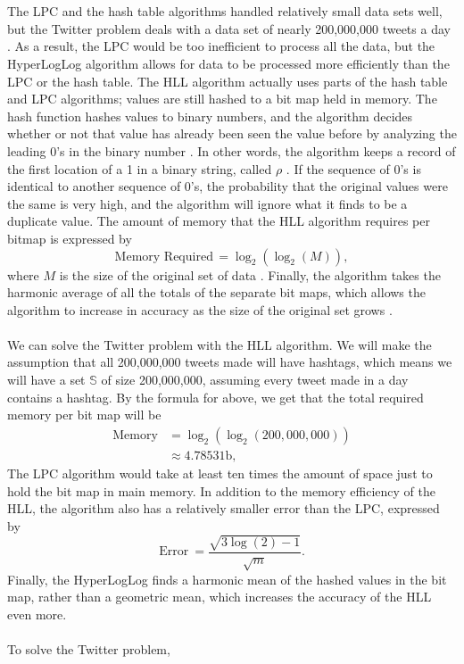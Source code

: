 \documentclass{article}
\begin{document}
\\\\
\indent The LPC and the hash table algorithms handled relatively small data sets well, but the Twitter problem deals with a data set of nearly 200,000,000 tweets a day \cite{Twitter-2}.
As a result, the LPC would be too inefficient to process all the data, but the HyperLogLog algorithm allows for data to be processed more efficiently than the LPC or the hash table. 
The HLL algorithm actually uses parts of the hash table and LPC algorithms; values are still hashed to a bit map held in memory. 
The hash function hashes values to binary numbers, and the algorithm decides whether or not that value has already been seen the value before by analyzing the leading 0's in the binary number \cite[pp. 685, 689]{Heule}.
In other words, the algorithm keeps a record of the first location of a 1 in a binary string, called $\rho$ \cite[pp. 130]{Flaj}.
If the sequence of 0's is identical to another sequence of 0's, the probability that the original values were the same is very high, and the algorithm will ignore what it finds to be a duplicate value. 
The amount of memory that the HLL algorithm requires per bitmap is expressed by
\[
\text{Memory Required}\, = \log_{2}{\left(\log_{2}{\left(M \right)}\right)},
\]
where $M$ is the size of the original set of data \cite[pp. 129]{Flaj}.
Finally, the algorithm takes the harmonic average of all the totals of the separate bit maps, which allows the algorithm to increase in accuracy as the size of the original set grows \cite{Yousra}.
\\\\
\indent We can solve the Twitter problem with the HLL algorithm. 
We will make the assumption that all 200,000,000 tweets made will have hashtags, which means we will have a set $\mathbb{S}$ of size 200,000,000, assuming every tweet made in a day contains a hashtag. 
By the formula for above, we get that the total required memory per bit map will be
\begin{align*}
\text{Memory} &=\log_{2}{\left(\log_{2}{\left( 200,000,000\right)}\right)}\\
&\approx  4.78531\text{b},
\end{align*}
The LPC algorithm would take at least ten times the amount of space just to hold the bit map in main memory.
In addition to the memory efficiency of the HLL, the algorithm also has a relatively smaller error than the LPC, expressed by
\[
\text{Error}\ =\frac{\sqrt{3\log{(2)} - 1}}{\sqrt{m}}.
\]
Finally, the HyperLogLog finds a harmonic mean of the hashed values in the bit map, rather than a geometric mean, which increases the accuracy of the HLL even more. 
\\\\
To solve the Twitter problem, 
\end{document}
